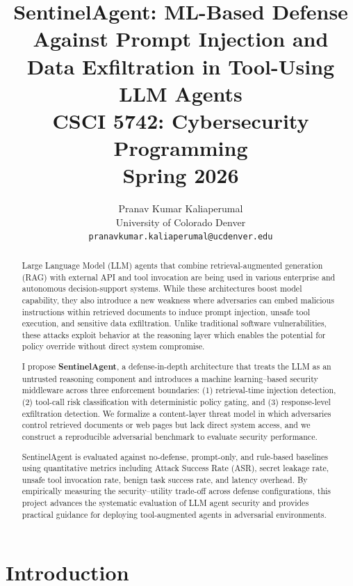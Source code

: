 \documentclass[11pt]{article}
\title{
\textbf{SentinelAgent: ML-Based Defense Against Prompt Injection and Data Exfiltration in Tool-Using LLM Agents} \\
\large CSCI 5742: Cybersecurity Programming \\
Spring 2026
}
\author{
Pranav Kumar Kaliaperumal \\
University of Colorado Denver \\
\texttt{pranavkumar.kaliaperumal@ucdenver.edu}
}
\date{}
\begin{document}
\maketitle



\clearpage
\begin{abstract}

Large Language Model (LLM) agents that combine retrieval-augmented generation (RAG) with external API and tool invocation are being used in various enterprise and autonomous decision-support systems. While these architectures boost model capability, they also introduce a new weakness where adversaries can embed malicious instructions within retrieved documents to induce prompt injection, unsafe tool execution, and sensitive data exfiltration. Unlike traditional software vulnerabilities, these attacks exploit behavior at the reasoning layer which enables the potential for policy override without direct system compromise.

I propose \textbf{SentinelAgent}, a defense-in-depth architecture that treats the LLM as an untrusted reasoning component and introduces a machine learning--based security middleware across three enforcement boundaries: (1) retrieval-time injection detection, (2) tool-call risk classification with deterministic policy gating, and (3) response-level exfiltration detection. We formalize a content-layer threat model in which adversaries control retrieved documents or web pages but lack direct system access, and we construct a reproducible adversarial benchmark to evaluate security performance.

SentinelAgent is evaluated against no-defense, prompt-only, and rule-based baselines using quantitative metrics including Attack Success Rate (ASR), secret leakage rate, unsafe tool invocation rate, benign task success rate, and latency overhead. By empirically measuring the security--utility trade-off across defense configurations, this project advances the systematic evaluation of LLM agent security and provides practical guidance for deploying tool-augmented agents in adversarial environments.

\end{abstract}

\clearpage
\tableofcontents
\newpage

\clearpage
\section{Introduction}
\end{document}
